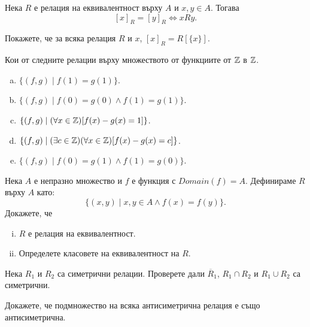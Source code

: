 \begin{lemma}
  Нека $R$ е релация на еквивалентност върху $A$ и $x,y\in A$. Тогава \[[x]_R = [y]_R \iff xRy.\]
\end{lemma}


\begin{problem}
  Покажете, че за всяка релация $R$ и $x$, $[x]_R = R[\{x\}]$.
\end{problem}

\begin{problem}
  Кои от следните релации върху множеството от функциите от $\mathbb{Z}$ в $\mathbb{Z}$.
  \begin{enumerate}[a)]
  \item
    $\{(f,g)\mid f(1) = g(1)\}$.
  \item
    $\{(f,g)\mid f(0) = g(0)\wedge f(1) = g(1)\}$.
  \item
    $\{(f,g)\mid (\forall x\in\mathbb{Z})[f(x)-g(x) = 1]\}$.
  \item
    $\{(f,g)\mid (\exists c\in\mathbb{Z})(\forall x\in\mathbb{Z})[f(x)-g(x) = c]\}$.
  \item
    $\{(f,g)\mid f(0) = g(1)\wedge f(1) = g(0)\}$.
  \end{enumerate}
\end{problem}


\begin{problem}
  Нека $A$ е непразно множество и $f$ е функция с $Domain(f) = A$.
  Дефинираме $R$ върху $A$ като:
  \[\{(x,y)\mid x,y\in A\wedge f(x) = f(y)\}.\]
  Докажете, че
  \begin{enumerate}[(i)]
  \item
    $R$ е релация на еквивалентност.
  \item
    Определете класовете на еквивалентност на $R$.
\end{enumerate}

\begin{problem}
  Нека $R_1$ и $R_2$ са симетрични релации.
  Проверете дали $\overline{R}_1$, $R_1\cap R_2$ и $R_1 \cup R_2$ са симетрични.
\end{problem}

\begin{problem}
  Докажете, че подмножество на всяка антисиметрична релация е също антисиметрична.
\end{problem}

\end{problem}


